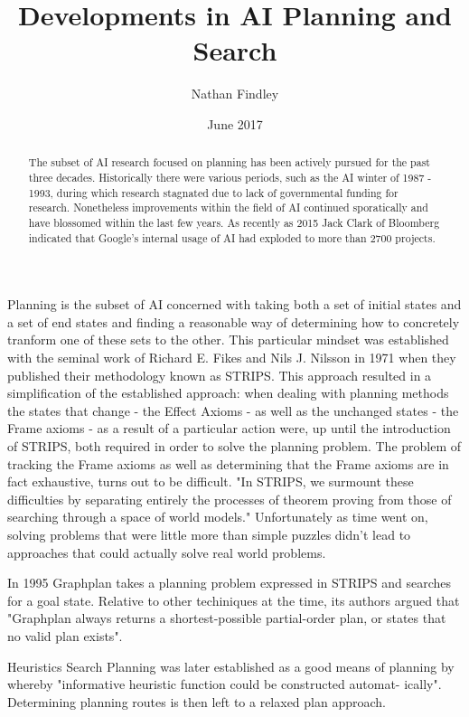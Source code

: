 \documentclass[10pt, a4paper]{article}
\title{Developments in AI Planning and Search}
\author{Nathan Findley}
\date{June 2017}
\begin{document}
\maketitle

\begin{abstract}

The subset of AI research focused on planning has been actively pursued for the past three decades.  
Historically there were various periods, such as the AI winter of 1987 - 1993, during which research
stagnated due to lack of governmental funding for research.  Nonetheless improvements within the field
of AI continued sporatically and have blossomed within the last few years.  As recently as 2015 Jack Clark
of Bloomberg indicated\cite{jack} that Google's internal usage of AI had exploded to more than 2700 projects.

\end{abstract}

Planning is the subset of AI concerned with taking both a set of initial states and a set of end states and finding
a reasonable way of determining how to concretely tranform one of these sets to the other.  This particular mindset
was established with the seminal work of Richard E. Fikes and Nils J. Nilsson in 1971 when they published their methodology
known as STRIPS.  This approach resulted in a simplification of the established approach:  when dealing with planning methods 
the states that change - the Effect Axioms - as well as the unchanged states - the Frame axioms - as a result of a particular action were, 
up until the introduction of STRIPS, both required in order to solve the planning problem\cite{derek}.  The problem of tracking the Frame axioms as well
as determining that the Frame axioms are in fact exhaustive, turns out to be difficult. 
"In STRIPS, we surmount these difficulties by separating entirely the processes of theorem proving from those of searching through a space of world models."\cite{richard}
Unfortunately as time went on, solving problems that were little more than simple puzzles didn't lead to approaches that could actually
solve real world problems.

In 1995 Graphplan takes a planning problem expressed in STRIPS and searches for a goal state.  Relative to other techiniques at the time, its
authors argued that "Graphplan always returns a shortest-possible partial-order plan, or states that no valid plan exists".\cite{ablum}

Heuristics Search Planning was later established as a good means of planning by whereby "informative heuristic function could be constructed automat-
ically"\cite{derek}.  Determining planning routes is then left to a relaxed plan approach.
\end{document}
